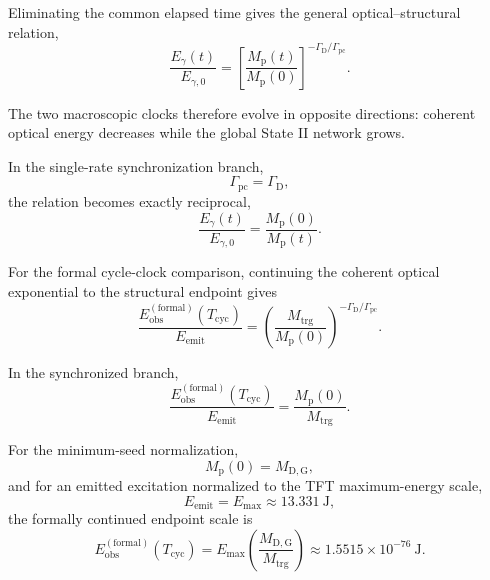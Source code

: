 Eliminating the common elapsed time gives the general optical--structural relation,
\begin{equation}
    \frac{
        E_\gamma(t)
    }{
        E_{\gamma,0}
    }
    =
    \left[
        \frac{
            M_{\mathrm p}(t)
        }{
            M_{\mathrm p}(0)
        }
    \right]^{
        -\Gamma_{\mathrm D}/\Gamma_{\mathrm{pc}}
    }.
\end{equation}

The two macroscopic clocks therefore evolve in opposite directions: coherent optical energy decreases while the global State II network grows.

In the single-rate synchronization branch,
\begin{equation}
    \Gamma_{\mathrm{pc}}
    =
    \Gamma_{\mathrm D},
\end{equation}
the relation becomes exactly reciprocal,
\begin{equation}
    \frac{
        E_\gamma(t)
    }{
        E_{\gamma,0}
    }
    =
    \frac{
        M_{\mathrm p}(0)
    }{
        M_{\mathrm p}(t)
    }.
\end{equation}

For the formal cycle-clock comparison, continuing the coherent optical exponential to the structural endpoint gives
\begin{equation}
    \frac{
        E_{\mathrm{obs}}^{(\mathrm{formal})}
        (T_{\mathrm{cyc}})
    }{
        E_{\mathrm{emit}}
    }
    =
    \left(
        \frac{
            M_{\mathrm{trg}}
        }{
            M_{\mathrm p}(0)
        }
    \right)^{
        -\Gamma_{\mathrm D}/\Gamma_{\mathrm{pc}}
    }.
\end{equation}

In the synchronized branch,
\begin{equation}
    \frac{
        E_{\mathrm{obs}}^{(\mathrm{formal})}
        (T_{\mathrm{cyc}})
    }{
        E_{\mathrm{emit}}
    }
    =
    \frac{
        M_{\mathrm p}(0)
    }{
        M_{\mathrm{trg}}
    }.
\end{equation}

For the minimum-seed normalization,
\begin{equation}
    M_{\mathrm p}(0)
    =
    M_{\mathrm{D,G}},
\end{equation}
and for an emitted excitation normalized to the TFT maximum-energy scale,
\begin{equation}
    E_{\mathrm{emit}}
    =
    E_{\mathrm{max}}
    \approx
    13.331\ \mathrm{J},
\end{equation}
the formally continued endpoint scale is
\begin{equation}
    E_{\mathrm{obs}}^{(\mathrm{formal})}
    (T_{\mathrm{cyc}})
    =
    E_{\mathrm{max}}
    \left(
        \frac{
            M_{\mathrm{D,G}}
        }{
            M_{\mathrm{trg}}
        }
    \right)
    \approx
    1.5515\times10^{-76}\ \mathrm{J}.
\end{equation}

